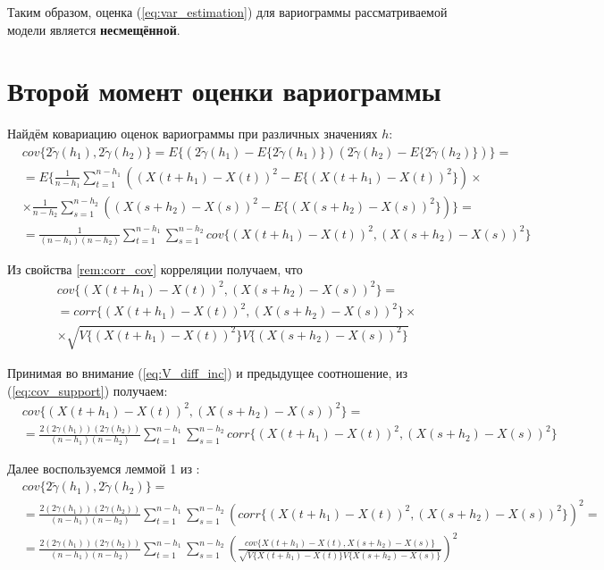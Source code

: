 Таким образом, оценка (\ref{eq:var_estimation}) для вариограммы рассматриваемой модели является \textbf{несмещённой}.


\section{Второй момент оценки вариограммы} %
\label{sec:variogram_second_moment}

Найдём ковариацию оценок вариограммы при различных значениях $h$:
\begin{eqnarray}
\label{eq:cov_support}
\nonumber
	& cov\{ 2 \tilde{\gamma}(h_1), 2 \tilde{\gamma}(h_2) \} = E\{ (2 \tilde{\gamma}(h_1) - E\{ 2 \tilde{\gamma}(h_1) \}) (2 \tilde{\gamma}(h_2) - E\{ 2 \tilde{\gamma}(h_2) \}) \} = \\
\nonumber
	& = E\{ \frac{1}{n - h_1} \sum_{t = 1}^{n - h_1}((X(t + h_1) - X(t))^2 - E\{ (X(t + h_1) - X(t))^2 \}) \times \\
\nonumber
	& \times \frac{1}{n - h_2} \sum_{s = 1}^{n - h_2}((X(s + h_2) - X(s))^2 - E\{ (X(s + h_2) - X(s))^2 \}) \} = \\
	& = \frac{1}{(n - h_1)(n - h_2)} \sum_{t = 1}^{n - h_1}\sum_{s = 1}^{n - h_2} cov\{ (X(t + h_1) - X(t))^2, (X(s + h_2) - X(s))^2 \}
\end{eqnarray}

Из свойства \ref{rem:corr_cov} корреляции получаем, что
\begin{eqnarray*}
	& cov\{ (X(t + h_1) - X(t))^2, (X(s + h_2) - X(s))^2 \} = \\
	& = corr\{(X(t + h_1) - X(t))^2, (X(s + h_2) - X(s))^2 \} \times \\
	& \times \sqrt{V\{ (X( t + h_1) - X(t))^2 \} V\{ (X(s + h_2) - X(s))^2 \}}
\end{eqnarray*}

Принимая во внимание (\ref{eq:V_diff_inc}) и предыдущее соотношение, из (\ref{eq:cov_support}) получаем:
\begin{eqnarray*}
	& cov\{ (X(t + h_1) - X(t))^2, (X(s + h_2) - X(s))^2 \} = \\
	& = \frac{2 (2\gamma(h_1))(2\gamma(h_2))}{(n - h_1)(n - h_2)}\sum_{t = 1}^{n - h_1}\sum_{s = 1}^{n - h_2} corr\{(X(t + h_1) - X(t))^2, (X(s + h_2) - X(s))^2 \}
\end{eqnarray*}

Далее воспользуемся леммой 1 из \cite{tsekhavaya-brest}:
\begin{eqnarray*}
	& cov\{ 2 \tilde{\gamma}(h_1), 2 \tilde{\gamma}(h_2) \} = \\
	& = \frac{2 (2\gamma(h_1))(2\gamma(h_2))}{(n - h_1)(n - h_2)}\sum_{t = 1}^{n - h_1}\sum_{s = 1}^{n - h_2} (corr\{(X(t + h_1) - X(t))^2, (X(s + h_2) - X(s))^2 \})^2 = \\
	& = \frac{2 (2\gamma(h_1))(2\gamma(h_2))}{(n - h_1)(n - h_2)}\sum_{t = 1}^{n - h_1}\sum_{s = 1}^{n - h_2} ( \frac{cov\{ X(t + h_1) - X(t), X(s + h_2) - X(s) \}}{\sqrt{V\{ X( t + h_1) - X(t) \} V\{ X(s + h_2) - X(s) \}}} )^2
\end{eqnarray*}

